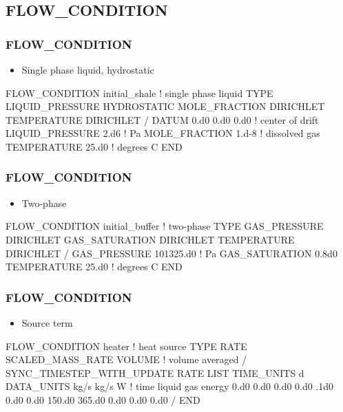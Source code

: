 \documentclass{beamer}
\newcommand\bluecomment[1]{{{\color{blue} #1}}}
\newcommand\greencomment[1]{{{\color{green} #1}}}
\begin{document}
\subsection{FLOW\_CONDITION}

\begin{frame}[fragile]\frametitle{FLOW\_CONDITION}
\begin{itemize}
  \item{Single phase liquid, hydrostatic}
\end{itemize}

\begin{semiverbatim}
FLOW_CONDITION \greencomment{initial_shale} \bluecomment{! single phase liquid}
  TYPE
    LIQUID_PRESSURE HYDROSTATIC
    MOLE_FRACTION DIRICHLET
    TEMPERATURE DIRICHLET
  /
  DATUM 0.d0 0.d0 0.d0 \bluecomment{! center of drift}
  LIQUID_PRESSURE 2.d6 \bluecomment{! Pa}
  MOLE_FRACTION 1.d-8 \bluecomment{! dissolved gas}
  TEMPERATURE 25.d0 \bluecomment{! degrees C}
END
\end{semiverbatim}
\end{frame}

\begin{frame}[fragile]\frametitle{FLOW\_CONDITION}
\begin{itemize}
  \item{Two-phase}
\end{itemize}

\begin{semiverbatim}
FLOW_CONDITION \greencomment{initial_buffer} \bluecomment{! two-phase}
  TYPE
    GAS_PRESSURE DIRICHLET
    GAS_SATURATION DIRICHLET
    TEMPERATURE DIRICHLET
  /
  GAS_PRESSURE 101325.d0 \bluecomment{! Pa}
  GAS_SATURATION 0.8d0
  TEMPERATURE 25.d0 \bluecomment{! degrees C}
END
\end{semiverbatim}
\end{frame}

\begin{frame}[fragile]\frametitle{FLOW\_CONDITION}
\begin{itemize}
  \item{Source term}
\end{itemize}

\begin{semiverbatim}
FLOW_CONDITION \greencomment{heater} \bluecomment{! heat source}
  TYPE
    RATE SCALED_MASS_RATE VOLUME \bluecomment{! volume averaged}
  /
  SYNC_TIMESTEP_WITH_UPDATE
  RATE LIST
    TIME_UNITS d
    DATA_UNITS kg/s kg/s W
    \bluecomment{! time liquid gas energy}
    0.d0 0.d0 0.d0 0.d0
    .1d0 0.d0 0.d0 150.d0
    365.d0 0.d0 0.d0 0.d0
  /
END
\end{semiverbatim}
\end{frame}
\end{document}
